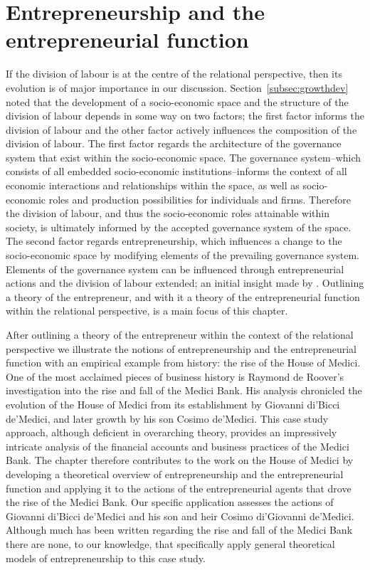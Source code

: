 \chapter{Entrepreneurship and the entrepreneurial function} 
\label{ch:entrepreneurship}

If the division of labour is at the centre of the relational perspective, then its evolution is of major importance in our discussion. Section~\ref{subsec:growthdev} noted that the development of a socio-economic space and the structure of the division of labour depends in some way on two factors; the first factor informs the division of labour and the other factor actively influences the composition of the division of labour. The first factor regards the architecture of the governance system that exist within the socio-economic space. The governance system--which consists of all embedded socio-economic institutions--informs the context of all economic interactions and relationships within the space, as well as socio-economic roles and production possibilities for individuals and firms. Therefore the division of labour, and thus the socio-economic roles attainable within society, is ultimately informed by the accepted governance system of the space. The second factor regards entrepreneurship, which influences a change to the socio-economic space by modifying elements of the prevailing governance system. Elements of the governance system can be influenced through entrepreneurial actions and the division of labour extended; an initial insight made by \citet{Smith1776}. Outlining a theory of the entrepreneur, and with it a theory of the entrepreneurial function within the relational perspective, is a main focus of this chapter.

After outlining a theory of the entrepreneur within the context of the relational perspective we illustrate the notions of entrepreneurship and the entrepreneurial function with an empirical example from history: the rise of the House of Medici. One of the most acclaimed pieces of business history is Raymond de Roover's investigation into the rise and fall of the Medici Bank. His analysis chronicled the evolution of the House of Medici from its establishment by Giovanni di'Bicci de'Medici, and later growth by his son Cosimo de'Medici. This case study approach, although deficient in overarching theory, provides an impressively intricate analysis of the financial accounts and business practices of the Medici Bank. The chapter therefore contributes to the work on the House of Medici by developing a theoretical overview of entrepreneurship and the entrepreneurial function and applying it to the actions of the entrepreneurial agents that drove the rise of the Medici Bank. Our specific application assesses the actions of Giovanni di'Bicci de'Medici and his son and heir Cosimo di'Giovanni de'Medici. Although much has been written regarding the rise and fall of the Medici Bank there are none, to our knowledge, that specifically apply general theoretical models of entrepreneurship to this case study.

